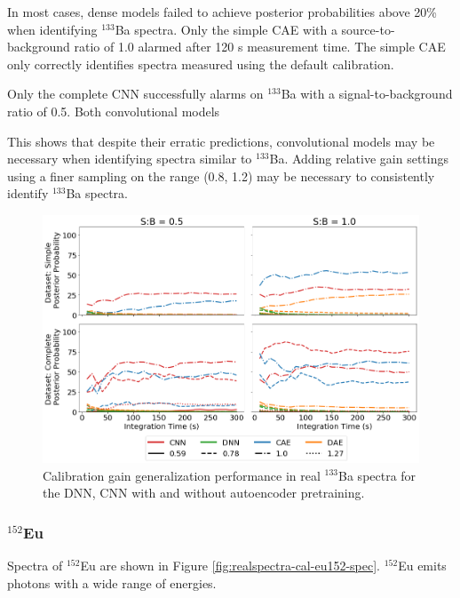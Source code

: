 In most cases, dense models failed to achieve posterior probabilities above 20\% when identifying $^{133}$Ba spectra. Only the simple CAE with a source-to-background ratio of 1.0 alarmed after 120 s measurement time. The simple CAE only correctly identifies spectra measured using the default calibration. 

Only the complete CNN successfully alarms on $^{133}$Ba with a signal-to-background ratio of 0.5. Both convolutional models 

This shows that despite their erratic predictions, convolutional models may be necessary when identifying spectra similar to $^{133}$Ba. Adding relative gain settings using a finer sampling on the range (0.8, 1.2) may be necessary to consistently identify $^{133}$Ba spectra.


\begin{figure}[H]
	\centering
	\includegraphics[width=1.0\linewidth]{images/realspectra-cal-ba133}
	\caption{Calibration gain generalization performance in real $^{133}$Ba spectra for the DNN, CNN with and without autoencoder pretraining.}
	\label{fig:realspectra-cal-ba133}
\end{figure}


\subsubsection{$^{152}$Eu}

Spectra of $^{152}$Eu are shown in Figure \ref{fig:realspectra-cal-eu152-spec}. $^{152}$Eu emits photons with a wide range of energies. 

